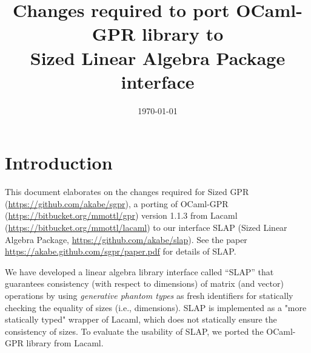 \documentclass[10pt,a4paper]{article}
\title{Changes required to port OCaml-GPR library to\\Sized Linear Algebra Package interface}
\author{Akinori Abe \hskip3em Eijiro Sumii\\Tohoku University}
\date{\today}
\begin{document}
\maketitle

\section{Introduction}

This document elaborates on the changes required for Sized GPR (\url{https://github.com/akabe/sgpr}),
a porting of OCaml-GPR (\url{https://bitbucket.org/mmottl/gpr}) version 1.1.3
from Lacaml (\url{https://bitbucket.org/mmottl/lacaml}) to our interface SLAP
(Sized Linear Algebra Package, \url{https://github.com/akabe/slap}).
See the paper \url{https://akabe.github.com/sgpr/paper.pdf} for details of SLAP.

We have developed a linear algebra library interface called ``SLAP'' that guarantees consistency (with respect to
dimensions) of matrix (and vector) operations by using \emph{generative phantom types}
as fresh identifiers for statically checking the equality of sizes (i.e., dimensions).
SLAP is implemented as a "more statically typed" wrapper of Lacaml,
which does not statically ensure the consistency of sizes.
To evaluate the usability of SLAP, we ported the OCaml-GPR library from Lacaml.
\end{document}
